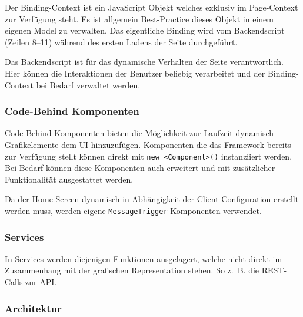 

Der Binding-Context ist ein JavaScript Objekt welches exklusiv im Page-Context zur Verfügung steht.
Es ist allgemein Best-Practice dieses Objekt in einem eigenen Model zu verwalten.
Das eigentliche Binding wird vom Backendscript~\emph{} (Zeilen 8--11) während des ersten Ladens der Seite durchgeführt.



Das Backendscript ist für das dynamische Verhalten der Seite verantwortlich.
Hier können die Interaktionen der Benutzer beliebig verarbeitet und der Binding-Context bei Bedarf verwaltet werden.



\subsubsection*{Code-Behind Komponenten}\label{subsubsec:code-behind-komponenten}
Code-Behind Komponenten bieten die Möglichkeit zur Laufzeit dynamisch Grafikelemente dem UI hinzuzufügen.
Komponenten die das Framework bereits zur Verfügung stellt können direkt mit \texttt{new \textless Component\textgreater()} instanziiert werden.
Bei Bedarf können diese Komponenten auch erweitert und mit zusätzlicher Funktionalität ausgestattet werden.

Da der Home-Screen dynamisch in Abhängigkeit der Client-Configuration erstellt werden muss, werden eigene \texttt{MessageTrigger} Komponenten verwendet.
\subsubsection*{Services}\label{subsubsec:services}
In Services werden diejenigen Funktionen ausgelagert, welche nicht direkt im Zusammenhang mit der grafischen Representation stehen.
So z.~B. die REST-Calls zur API.

\clearpage

\subsubsection{Architektur}



